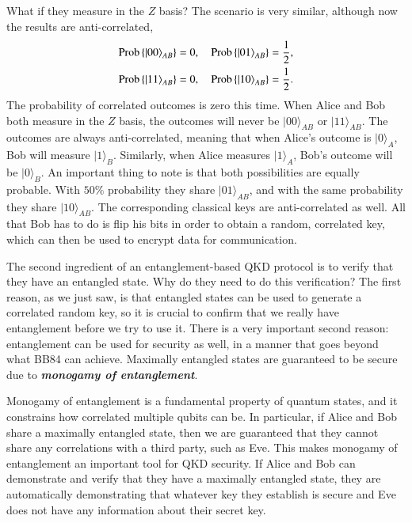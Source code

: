 What if they measure in the $Z$ basis? The scenario is very similar, although now the results are anti-correlated,
\begin{align}
\begin{aligned}
    \operatorname{Prob}\left\{\ket{00}_{A B}\right\} & = 0, \quad \operatorname{Prob}\left\{\ket{01}_{A B}\right\} = \frac{1}{2}, \\ 
    \operatorname{Prob}\left\{\ket{11}_{A B}\right\} & = 0, \quad \operatorname{Prob}\left\{\ket{10}_{A B}\right\} = \frac{1}{2}.
\end{aligned}
\end{align}
The probability of correlated outcomes is zero this time.
When Alice and Bob both measure in the $Z$ basis, the outcomes will never be $|00\rangle_{AB}$ or $|11\rangle_{AB}$.
The outcomes are always anti-correlated, meaning that when Alice's outcome is $|0\rangle_A$, Bob will measure $|1\rangle_B$.
Similarly, when Alice measures $|1\rangle_A$, Bob's outcome will be $|0\rangle_B$.
An important thing to note is that both possibilities are equally probable. With $50\%$ probability they share $|01\rangle_{AB}$, and with the same probability they share $|10\rangle_{AB}$.
The corresponding classical keys are anti-correlated as well.
All that Bob has to do is flip his bits in order to obtain a random, correlated key, which can then be used to encrypt data for communication.

The second ingredient of an entanglement-based QKD protocol is to verify that they have an entangled state.
Why do they need to do this verification?
The first reason, as we just saw, is that entangled states can be used to generate a correlated random key, so it is crucial to confirm that we really have entanglement before we try to use it.
There is a very important second reason: entanglement can be used for security as well, in a manner that goes beyond what BB84 can achieve. Maximally entangled states are guaranteed to be secure due to \textbf{\emph{monogamy of entanglement}}.

Monogamy of entanglement is a fundamental property of quantum states,
and it constrains how correlated multiple qubits can be.
In particular, if Alice and Bob share a maximally entangled state,
then we are guaranteed that they cannot share any correlations with a third party, such as Eve.
This makes monogamy of entanglement an important tool for QKD security.
If Alice and Bob can demonstrate and verify that they have a maximally entangled state, they are automatically demonstrating that whatever
key they establish is secure and Eve does not have any information about their secret key.


